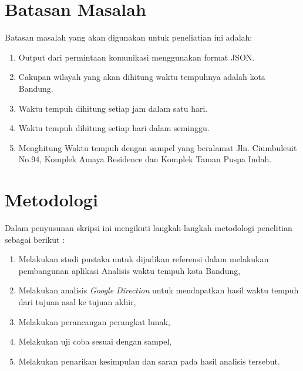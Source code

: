 \section{Batasan Masalah}
\label{sec:batasan}
Batasan masalah yang akan digunakan untuk peneliatian ini adalah:
\begin{enumerate}
	\item Output dari permintaan komunikasi menggunakan format JSON.
	\item Cakupan wilayah yang akan dihitung waktu tempuhnya adalah kota Bandung.
	\item Waktu tempuh dihitung setiap jam dalam satu hari.
	\item Waktu tempuh dihitung setiap hari dalam seminggu.
	\item Menghitung Waktu tempuh dengan sampel yang beralamat Jln. Ciumbuleuit No.94, Komplek Amaya Residence dan Komplek Taman Puspa Indah.
\end{enumerate}

\section{Metodologi}
\label{sec:metlit}
Dalam penyusunan skripsi ini mengikuti langkah-langkah metodologi penelitian sebagai berikut :
\begin{enumerate}
	\item Melakukan studi pustaka untuk dijadikan referensi dalam melakukan pembangunan aplikasi Analisis waktu tempuh kota Bandung,
	\item Melakukan analisis \textit{Google Direction} untuk mendapatkan hasil waktu tempuh dari tujuan asal ke tujuan akhir,
	\item Melakukan perancangan perangkat lunak,
	\item Melakukan uji coba sesuai dengan sampel,
	\item Melakukan penarikan kesimpulan dan saran pada hasil analisis tersebut.
\end{enumerate}


